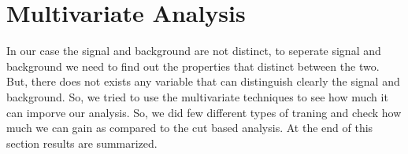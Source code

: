 \section{Multivariate Analysis}
In our case the signal and background are not distinct, to seperate signal and background we need to find out the properties that distinct between the two. But, there does not exists any variable that can distinguish clearly the signal and background. So, we tried to use the multivariate techniques to see how much it can imporve our analysis. So, we did few different types of traning and check how much we can gain as compared to the cut based analysis. At the end of this section results are summarized.

%
%


%
%

%
%
